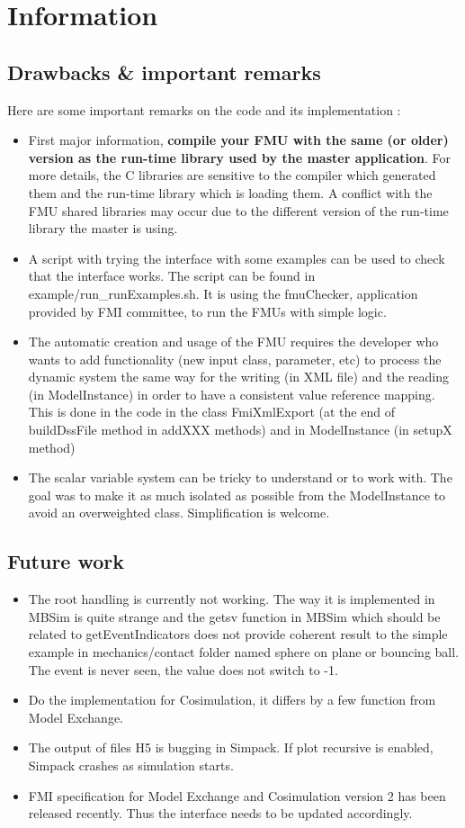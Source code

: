 \documentclass[10pt,a4paper]{report}
\begin{document}
\chapter{Information}
%
\section{Drawbacks \& important remarks}
Here are some important remarks on the code and its implementation :
%
\begin{itemize}
  \item First major information, \textbf{compile your FMU with the same (or older) version as the run-time library used by the master application}. For more details, the C libraries are sensitive to the compiler which generated them and the run-time library which is loading them. A conflict with the FMU shared libraries may occur due to the different version of the run-time library the master is using.
  \item A script with trying the interface with some examples can be used to check that the interface works. The script can be found in example/run\_runExamples.sh. It is using the fmuChecker, application provided by FMI committee, to run the FMUs with simple logic.
  \item The automatic creation and usage of the FMU requires the developer who wants to add functionality (new input class, parameter, etc) to process the dynamic system the same way for the writing (in XML file) and the reading (in ModelInstance) in order to have a consistent value reference mapping. This is done in the code in the class FmiXmlExport (at the end of buildDssFile method in addXXX methods) and in ModelInstance (in setupX method)
  \item The scalar variable system can be tricky to understand or to work with. The goal was to make it as much isolated as possible from the ModelInstance to avoid an overweighted class. Simplification is welcome.
\end{itemize}
%
\section{Future work}
\begin{itemize}
\item The root handling is currently not working. The way it is implemented in MBSim is quite strange and the getsv function in MBSim which should be related to getEventIndicators does not provide coherent result to the simple example in mechanics/contact folder named sphere on plane or bouncing ball. The event is never seen, the value does not switch to -1.
%
\item Do the implementation for Cosimulation, it differs by a few function from Model Exchange.
%
\item The output of files H5 is bugging in Simpack. If plot recursive is enabled, Simpack crashes as simulation starts.
%
\item FMI specification for Model Exchange and Cosimulation version 2 has been released recently. Thus the interface needs to be updated accordingly.
\end{itemize}
%
\end{document}
